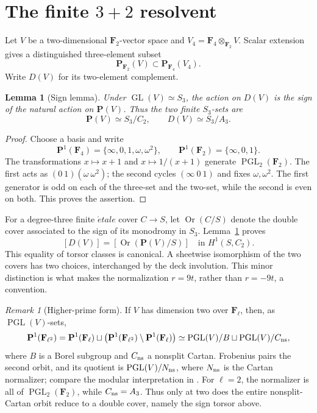\documentclass[11pt]{article}
\numberwithin{equation}{section}
\newtheorem{lemma}[theorem]{Lemma}
\theoremstyle{definition}
\theoremstyle{remark}
\newtheorem{remark}[theorem]{Remark}
\newcommand{\F}{\mathbf F}
\newcommand{\PP}{\mathbf P}
\newcommand{\Or}{\operatorname{Or}}
\begin{document}
\section{The finite \texorpdfstring{\(3+2\)}{3+2} resolvent}

Let \(V\) be a two-dimensional \(\F_2\)-vector space and
\(V_4=\F_4\otimes_{\F_2}V\).  Scalar extension gives a distinguished
three-element subset
\[
 \PP_{\F_2}(V)\subset\PP_{\F_4}(V_4).
\]
Write \(D(V)\) for its two-element complement.

\begin{lemma}[Sign lemma]\label{lem:sign}
Under \(\operatorname{GL}(V)\simeq S_3\), the action on \(D(V)\) is the sign
of the natural action on \(\PP(V)\).  Thus the two finite \(S_3\)-sets are
\[
 \PP(V)\simeq S_3/C_2,
 \qquad
 D(V)\simeq S_3/A_3.
\]
\end{lemma}

\begin{proof}
Choose a basis and write
\[
 \PP^1(\F_4)=\{\infty,0,1,\omega,\omega^2\},\qquad
 \PP^1(\F_2)=\{\infty,0,1\}.
\]
The transformations \(x\mapsto x+1\) and
\(x\mapsto 1/(x+1)\) generate \(\operatorname{PGL}_2(\F_2)\).  The first
acts as \((0\ 1)(\omega\ \omega^2)\); the second cycles
\((\infty\ 0\ 1)\) and fixes \(\omega,\omega^2\).  The first generator is
odd on each of the three-set and the two-set, while the second is even on
both.  This proves the assertion.
\end{proof}

For a degree-three finite \(\acute etale\) cover \(C\to S\), let
\(\Or(C/S)\) denote the double cover associated to the sign of its monodromy
in \(S_3\).  Lemma~\ref{lem:sign} proves
\begin{equation}\label{eq:torsor-class}
 [D(V)]=[\Or(\PP(V)/S)]\quad\text{in }H^1(S,C_2).
\end{equation}
This equality of torsor classes is canonical.  A sheetwise isomorphism of
the two covers has two choices, interchanged by the deck involution.  This
minor distinction is what makes the normalization \(r=9t\), rather than
\(r=-9t\), a convention.

\begin{remark}[Higher-prime form]
If \(V\) has
dimension two over \(\F_\ell\), then, as \(\operatorname{PGL}(V)\)-sets,
\[
 \PP^1(\F_{\ell^2})
 =\PP^1(\F_\ell)\sqcup
   \bigl(\PP^1(\F_{\ell^2})\setminus\PP^1(\F_\ell)\bigr)
 \simeq \operatorname{PGL}(V)/B
       \sqcup\operatorname{PGL}(V)/C_{\rm ns},
\]
where \(B\) is a Borel subgroup and \(C_{\rm ns}\) a nonsplit Cartan.
Frobenius pairs the second orbit, and its quotient is
\(\operatorname{PGL}(V)/N_{\rm ns}\), where \(N_{\rm ns}\) is the Cartan
normalizer;
compare the modular interpretation in
\cite[Section~2]{RebolledoWuthrich}.  For
\(\ell=2\), the normalizer is all of
\(\operatorname{PGL}_2(\F_2)\), while
\(C_{\rm ns}=A_3\).  Thus only at two does the entire nonsplit-Cartan orbit
reduce to a double cover, namely the sign torsor above.
\end{remark}
\end{document}

